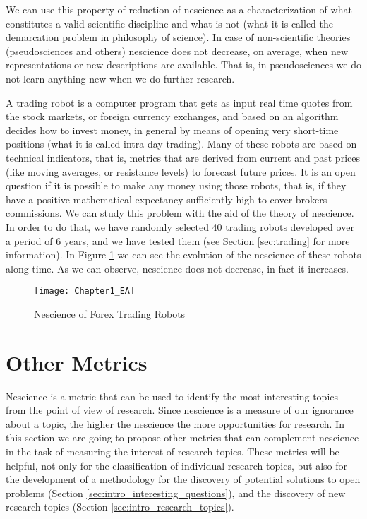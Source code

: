We can use this property of reduction of nescience as a characterization of what constitutes a valid scientific discipline and what is not (what it is called the demarcation problem in philosophy of science). In case of non-scientific theories (pseudosciences and others) nescience does not decrease, on average, when new representations or new descriptions are available. That is, in pseudosciences we do not learn anything new when we do further research.

\begin{example}
A trading robot is a computer program that gets as input real time quotes from the stock markets, or foreign currency exchanges, and based on an algorithm decides how to invest money, in general by means of opening very short-time positions (what it is called intra-day trading). Many of these robots are based on technical indicators, that is, metrics that are derived from current and past prices (like moving averages, or resistance levels) to forecast future prices. It is an open question if it is possible to make any money using those robots, that is, if they have a positive mathematical expectancy sufficiently high to cover brokers commissions. We can study this problem with the aid of the theory of nescience. In order to do that, we have randomly selected 40 trading robots developed over a period of 6 years, and we have tested them (see Section \ref{sec:trading} for more information). In Figure \ref{fig:Chapter1_EA} we can see the evolution of the nescience of these robots along time. As we can observe, nescience does not decrease, in fact it increases.
\end{example}

\begin{figure}[h]
\centering\texttt{[image: Chapter1\_EA]}
\caption{\label{fig:Chapter1_EA}Nescience of Forex Trading Robots}
\end{figure}

%
%

\section{Other Metrics}

Nescience is a metric that can be used to identify the most interesting topics from the point of view of research. Since nescience is a measure of our ignorance about a topic, the higher the nescience the more opportunities for research. In this section we are going to propose other metrics that can complement nescience in the task of measuring the interest of research topics. These metrics will be helpful, not only for the classification of individual research topics, but also for the development of a methodology for the discovery of potential solutions to open problems (Section \ref{sec:intro_interesting_questions}), and the discovery of new research topics (Section \ref{sec:intro_research_topics}).


